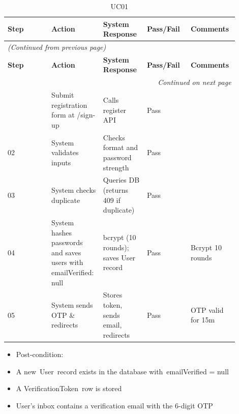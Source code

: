 \begin{longtable}{|p{0.18\linewidth}|p{0.18\linewidth}|p{0.18\linewidth}|p{0.18\linewidth}|p{0.18\linewidth}|}
\caption{UC01} \label{tab:27} \\
\hline
\textbf{Step} & \textbf{Action} & \textbf{System Response} & \textbf{Pass/Fail} & \textbf{Comments} \\
\hline
\endfirsthead
\multicolumn{5}{l}{\textit{(Continued from previous page)}} \\
\hline
\textbf{Step} & \textbf{Action} & \textbf{System Response} & \textbf{Pass/Fail} & \textbf{Comments} \\
\hline
\endhead
\hline \multicolumn{5}{r}{\textit{Continued on next page}} \\
\endfoot
\hline
\endlastfoot
01 & Submit registration form at /sign-up & Calls register API & Pass &  \\
\hline
02 & System validates inputs & Checks format and password strength & Pass &  \\
\hline
03 & System checks duplicate & Queries DB (returns 409 if duplicate) & Pass &  \\
\hline
04 & System hashes passwords and saves users with emailVerified: null & bcrypt (10 rounds); saves User record & Pass & Bcrypt 10 rounds \\
\hline
05 & System sends OTP \& redirects & Stores token, sends email, redirects & Pass & OTP valid for 15m \\
\hline
\end{longtable}

\begin{itemize}
  \item Post-condition:
  \item A new~User~record exists in the database with~emailVerified = null
  \item A VerificationToken~row is stored
  \item User's inbox contains a verification email with the 6-digit OTP
\end{itemize}

